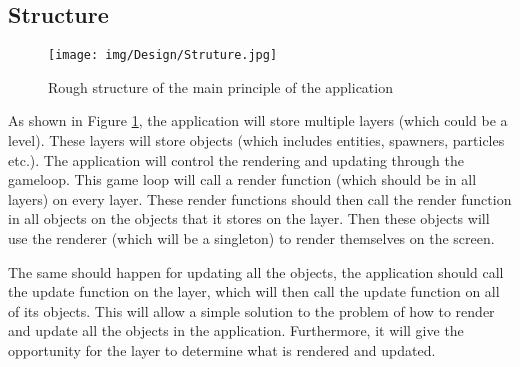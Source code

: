 \documentclass[../Main.tex]{subfiles}
\begin{document}
    \subsection{Structure}
        \begin{figure}[hbt!]
            \centerline{\texttt{[image: img/Design/Struture.jpg]}}
            \caption{Rough structure of the main principle of the application}
            \label{fig:Structure}
        \end{figure}
        As shown in Figure \ref{fig:Structure}, the application will store multiple layers (which could be a level). These layers will store objects (which includes entities, spawners, particles etc.). The application will control the rendering and updating through the gameloop. This game loop will call a render function (which should be in all layers) on every layer. These render functions should then call the render function in all objects on the objects that it stores on the layer. Then these objects will use the renderer (which will be a singleton) to render themselves on the screen.

        The same should happen for updating all the objects, the application should call the update function on the layer, which will then call the update function on all of its objects. This will allow a simple solution to the problem of how to render and update all the objects in the application. Furthermore, it will give the opportunity for the layer to determine what is rendered and updated.
\end{document}
